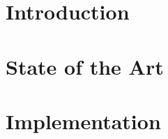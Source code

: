 \documentclass[11pt]{report}
\begin{document}











\tableofcontents

\listoffigures

\listoftables 

\pagestyle{headings}

\chapter{Introduction}
\label{sec:intro}


\chapter{State of the Art}
\label{sec:sota}


\chapter{Implementation}
\label{sec:imp}


\newpage


\end{document}
